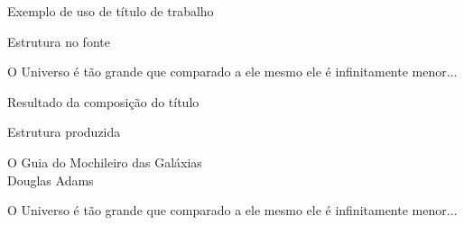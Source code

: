 \begin{frame}{Exemplo de uso de título de trabalho}
	\begin{Codigo}{Estrutura no fonte}
		\n
		\n
		\n
		\n
		\n
		\n

		O Universo é tão grande que comparado a ele mesmo ele é infinitamente menor...\n
	\end{Codigo}
\end{frame}

\begin{frame}{Resultado da composição do título}
	\begin{Resultado}{Estrutura produzida}
		{\centering
		{\Large O Guia do Mochileiro das Galáxias}\\[\baselineskip]
		{Douglas Adams}\par}

		\vspace{4\baselineskip}

		O Universo é tão grande que comparado a ele mesmo ele é infinitamente menor...
	\end{Resultado}
\end{frame}

